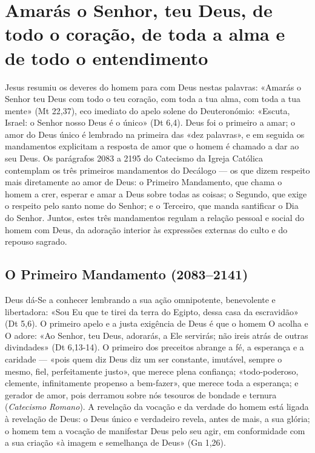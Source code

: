 \chapter{Amarás o Senhor, teu Deus, de todo o coração, de toda a alma e de todo o entendimento}

Jesus resumiu os deveres do homem para com Deus nestas palavras: «Amarás o Senhor teu Deus com todo o teu coração, com toda a tua alma, com toda a tua mente» (Mt 22,37), eco imediato do apelo solene do Deuteronómio: «Escuta, Israel: o Senhor nosso Deus é o único» (Dt 6,4). Deus foi o primeiro a amar; o amor do Deus único é lembrado na primeira das «dez palavras», e em seguida os mandamentos explicitam a resposta de amor que o homem é chamado a dar ao seu Deus. Os parágrafos 2083 a 2195 do Catecismo da Igreja Católica contemplam os três primeiros mandamentos do Decálogo --- os que dizem respeito mais diretamente ao amor de Deus: o Primeiro Mandamento, que chama o homem a crer, esperar e amar a Deus sobre todas as coisas; o Segundo, que exige o respeito pelo santo nome do Senhor; e o Terceiro, que manda santificar o Dia do Senhor. Juntos, estes três mandamentos regulam a relação pessoal e social do homem com Deus, da adoração interior às expressões externas do culto e do repouso sagrado.

\section{O Primeiro Mandamento (2083--2141)}

Deus dá-Se a conhecer lembrando a sua ação omnipotente, benevolente e libertadora: «Sou Eu que te tirei da terra do Egipto, dessa casa da escravidão» (Dt 5,6). O primeiro apelo e a justa exigência de Deus é que o homem O acolha e O adore: «Ao Senhor, teu Deus, adorarás, a Ele servirás; não ireis atrás de outras divindades» (Dt 6,13-14). O primeiro dos preceitos abrange a fé, a esperança e a caridade --- «pois quem diz Deus diz um ser constante, imutável, sempre o mesmo, fiel, perfeitamente justo», que merece plena confiança; «todo-poderoso, clemente, infinitamente propenso a bem-fazer», que merece toda a esperança; e gerador de amor, pois derramou sobre nós tesouros de bondade e ternura (\textit{Catecismo Romano}). A revelação da vocação e da verdade do homem está ligada à revelação de Deus: o Deus único e verdadeiro revela, antes de mais, a sua glória; o homem tem a vocação de manifestar Deus pelo seu agir, em conformidade com a sua criação «à imagem e semelhança de Deus» (Gn 1,26).

